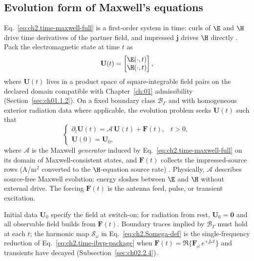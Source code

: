 
\subsection{Evolution form of Maxwell's equations}
\label{sec:ch02.2.7}

Eq.~\eqref{eq:ch2.time-maxwell-full} is a first-order system in time: curls of $\E$ and $\H$ drive time derivatives of the partner field, and impressed $\mathbf{j}$ drives $\H$ directly \cite{maxwell1873,stratton1941}. Pack the electromagnetic state at time $t$ as
\begin{equation}
\label{eq:ch2.time-state-vector}
\mathbf{U}(t)=
\begin{bmatrix}\E(\cdot,t)\\ \H(\cdot,t)\end{bmatrix},
\end{equation}
where $\mathbf{U}(t)$ lives in a product space of square-integrable field pairs on the declared domain compatible with Chapter~\ref{ch:01} admissibility (Section~\ref{sec:ch01.1.2}). On a fixed boundary class $\mathcal{B}_\Gamma$ and with homogeneous exterior radiation data where applicable, the evolution problem seeks $\mathbf{U}(t)$ such that
\begin{equation}
\label{eq:ch2.time-ibvp-package}
\begin{cases}
\partial_t\mathbf{U}(t)=\mathcal{A}\,\mathbf{U}(t)+\mathbf{F}(t), & t>0,\\[2pt]
\mathbf{U}(0)=\mathbf{U}_0, &
\end{cases}
\end{equation}
where $\mathcal{A}$ is the Maxwell \emph{generator} induced by Eq.~\eqref{eq:ch2.time-maxwell-full} on its domain of Maxwell-consistent states, and $\mathbf{F}(t)$ collects the impressed-source rows (A/m$^2$ converted to the $\H$-equation source rate) \cite{stratton1941}. Physically, $\mathcal{A}$ describes source-free Maxwell evolution: energy sloshes between $\E$ and $\H$ without external drive. The forcing $\mathbf{F}(t)$ is the antenna feed, pulse, or transient excitation.

Initial data $\mathbf{U}_0$ specify the field at switch-on; for radiation from rest, $\mathbf{U}_0=\mathbf{0}$ and all observable field builds from $\mathbf{F}(t)$. Boundary traces implied by $\mathcal{B}_\Gamma$ must hold at each $t$; the harmonic map $\mathcal{S}_\omega$ in Eq.~\eqref{eq:ch2.Somega-def} is the single-frequency reduction of Eq.~\eqref{eq:ch2.time-ibvp-package} when $\mathbf{F}(t)=\Re\{\mathbf{F}_\omega\,e^{+\jj\omega t}\}$ and transients have decayed (Subsection~\ref{sec:ch02.2.4}).

